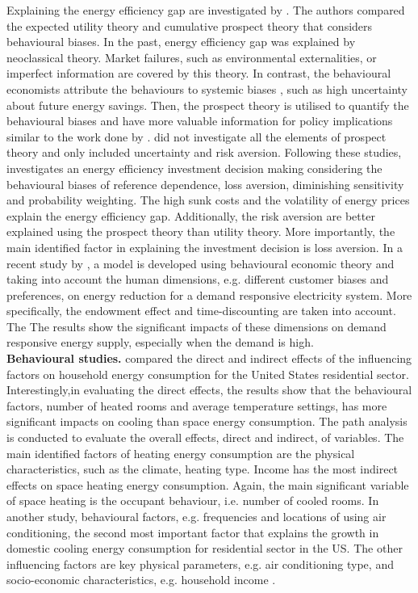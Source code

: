 \documentclass[preprint,12pt,3p]{elsarticle}
\begin{document}
Explaining the energy efficiency gap are investigated by \citep{hackel2017}. The authors compared the expected utility theory and cumulative prospect theory that considers behavioural biases. In the past, energy efficiency gap was explained by neoclassical theory. Market failures, such as environmental externalities, or imperfect information are covered by this theory. In contrast, the behavioural economists  attribute the behaviours to systemic biases \citep{barberis2013}, such as high uncertainty about future energy savings. Then, the prospect theory is utilised to quantify the behavioural biases and have more valuable information for policy implications similar to the work done by \citep{mayer1995, greene2011}.  \citeauthor{mayer1995} \citeyearpar{mayer1995} did not investigate all the elements of prospect theory and \citeauthor{greene2011} \citeyear{greene2011} only included uncertainty and risk aversion. Following these studies, \citeauthor{hackel2017} \citeyearpar{hackel2017} investigates an energy efficiency investment decision making considering the behavioural biases of reference dependence, loss aversion, diminishing sensitivity and probability weighting. The high sunk costs and the volatility of energy prices explain the energy efficiency gap. Additionally, the risk aversion are better explained using the prospect theory than utility theory. More importantly, the main identified factor in explaining the investment decision is loss aversion. In a recent study by \citep{good2019}, a model is developed using behavioural economic theory and taking into account the human dimensions, e.g. different customer biases and preferences, on energy reduction for a demand responsive electricity system. More specifically, the endowment effect and time-discounting are taken into account. The The results show the significant impacts of these dimensions on demand responsive energy supply, especially when the demand is high.
\\
\newline
\noindent
\textbf{Behavioural studies.}  \citeauthor{steemers2009} \citeyearpar{steemers2009} compared the direct and indirect effects of the  influencing factors on household energy consumption for the United States residential sector. Interestingly,in evaluating the direct effects, the results show that the behavioural factors, number of heated rooms and average temperature settings, has more significant impacts on cooling than space energy consumption. The path analysis is conducted to evaluate the overall effects, direct and indirect, of variables. The main identified factors of heating energy consumption are the physical characteristics, such as the climate, heating type. Income has the most indirect effects on space heating energy consumption. Again, the main significant variable of space heating is the occupant behaviour, i.e. number of cooled rooms. In another study, behavioural factors, e.g. frequencies and locations of using air conditioning, the second most important factor that explains the growth in domestic cooling energy consumption for residential sector in the US. The other influencing factors are key physical parameters, e.g. air conditioning type, and socio-economic characteristics, e.g. household income  \citep{yun2011}. 
\end{document}
